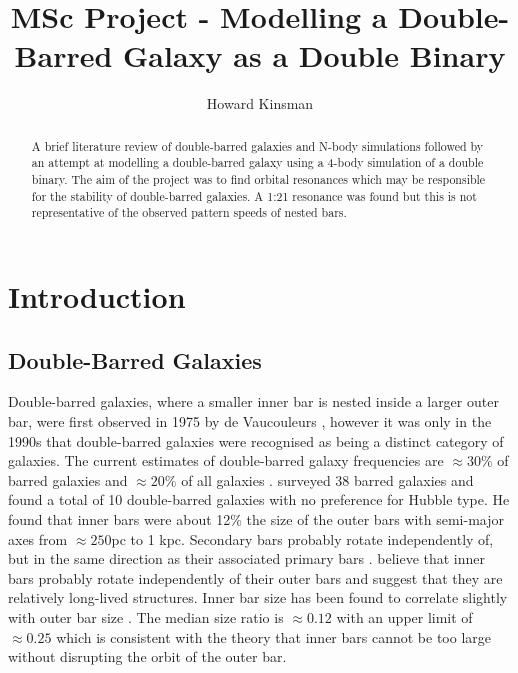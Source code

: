 \documentclass[a4paper,12pt]{article}
\author{Howard Kinsman}
\title{MSc Project - Modelling a Double-Barred Galaxy as a Double Binary}
\begin{document}
\maketitle
\begin{abstract}
A brief literature review of double-barred galaxies and N-body simulations followed by an attempt at modelling a double-barred galaxy using a 4-body simulation of a double binary.  The aim of the project was to
find orbital resonances which may be responsible for the stability of double-barred galaxies. A 1:21 resonance was found but this is not representative of the observed pattern speeds of nested bars.
\end{abstract}
\section{Introduction}
\subsection{Double-Barred Galaxies} 
Double-barred galaxies, where a smaller inner bar is nested inside a larger outer bar, were first observed in 1975 by de Vaucouleurs \citep{vaucouleurs}, however it was only in the 1990s that double-barred galaxies
were recognised as being a distinct category of galaxies. The current estimates of double-barred galaxy frequencies are $\approx30\%$ of barred galaxies and $\approx20\%$ of all galaxies \citep{erwin3}.
\cite{erwin2} surveyed 38 barred galaxies and found a total of 10 double-barred galaxies with no preference for Hubble type. He found that inner bars were about 12\% the size of the outer bars with
semi-major axes from $\approx250$pc to 1 kpc. Secondary bars probably rotate independently of, but in the same direction as their associated primary bars \citep{erwin2}.
\cite{erwin1} believe that inner bars probably rotate independently of their outer bars and suggest that they are relatively long-lived structures.
Inner bar size has been found to correlate slightly with outer bar size \citep{erwin3}. The median size ratio is $\approx0.12$ with an upper limit of $\approx0.25$ which is consistent with the theory that
inner bars cannot be too large without disrupting the orbit of the outer bar.
\end{document}
